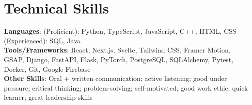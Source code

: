 \documentclass[letterpaper,10pt]{article}
\begin{document}

\section{Technical Skills}
 \begin{itemize}[leftmargin=0.15in, label={}]
    \small{\item{
     \textbf{Languages}{: (Proficient): Python, TypeScript, JavaScript, C++, HTML, CSS (Experienced): SQL, Java} \\
     \textbf{Tools/Frameworks}{: React, Next.js, Svelte, Tailwind CSS, Framer Motion, GSAP, Django, FastAPI, Flask, PyTorch, PostgreSQL, SQLAlchemy, Pytest, Docker, Git, Google Firebase} \\
     \textbf{Other Skills}{: Oral + written communication; active listening; good under pressure; critical thinking; problem-solving; self-motivated; good work ethic; quick learner; great leadership skills} }}
 \end{itemize}


\end{document}
